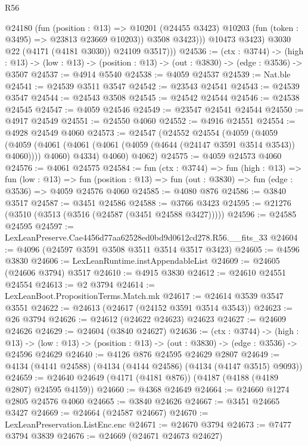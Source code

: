 \begin{lexlean}{R56}
\begin{coremodule}
                @24180
                  (fun (position : @13) =>
                  @10201 (@24455 @3423) @10203 (fun (token : @3495) => @23813 @23669 @10203))
                  @3508
                  @3423)))
            @10473
            @3423)
          @3030
          @22
          (@4171 (@4181 @3030))
          @24109
          @3517)))
@24536 := (ctx : @3744) ->
  (high : @13) -> (low : @13) -> (position : @13) -> (out : @3830) -> (edge : @3536) -> @3507
@24537 := @4914 @5540
@24538 := @4059 @24537
@24539 := Nat.ble
@24541 := @24539 @3511 @3547
@24542 := @23543 @24541
@24543 := @24539 @3547
@24544 := @24543 @3508
@24545 := @24542 @24544
@24546 := @24538 @24545
@24547 := @4059 @24546
@24549 := @23547 @24541 @24544
@24550 := @4917 @24549
@24551 := @24550 @4060
@24552 := @4916 @24551
@24554 := @4928 @24549 @4060
@24573 := @24547
    (@24552
      @24554
      (@4059
        (@4059
          (@4059 (@4061 (@4061 (@4061 (@4059 (@4644 (@24147 @3591 @3514 @3543)) @4060)))) @4060)
          @4334)
        @4060)
      @4062)
@24575 := @4059 @24573 @4060
@24576 := @4061 @24575
@24584 := fun (ctx : @3744) =>
  fun (high : @13) =>
  fun (low : @13) =>
  fun (position : @13) => fun (out : @3830) => fun (edge : @3536) => @4059 @24576 @4060
@24585 := @4080 @876
@24586 := @3840 @3517
@24587 := @3451 @24586
@24588 := @3766 @3423
@24595 := @21276 (@3510 (@3513 (@3516 (@24587 (@3451 @24588 @3427)))))
@24596 := @24585 @24595
@24597 := LexLeanPreserve.Cae4456d77aa62528ed0bd9d0612cd278.R56.__fits_33
@24604 := @4096 (@24597 @3591 @3508 @3511 @3514 @3517 @3423)
@24605 := @4596 @3830
@24606 := LexLeanRuntime.instAppendableList
@24609 := @24605 (@24606 @3794) @3517
@24610 := @4915 @3830
@24612 := @24610 @24551 @24554
@24613 := @2 @3794
@24614 := LexLeanBoot.PropositionTerms.Match.mk
@24617 := @24614 @3539 @3547 @3551
@24622 := @24613 (@24617 (@24152 @3591 @3514 @3543))
@24623 := @26 @3794
@24626 := @24612 (@24622 @24623) @24623
@24627 := @24609 @24626
@24629 := @24604 (@3840 @24627)
@24636 := (ctx : @3744) ->
  (high : @13) ->
  (low : @13) -> (position : @13) -> (out : @3830) -> (edge : @3536) -> @24596 @24629
@24640 := @4126 @876 @24595 @24629 @2807
@24649 := @4134 (@4141 @24588) (@4134 (@4144 @24586) (@4134 (@4147 @3515) @9093))
@24659 := @24640 @24649 (@4171 (@4181 @876)) (@4187 (@4188 (@4189 @2807) @24595 @4159))
@24660 := @4368 @24649
@24664 := @24660 @1274 @2805 @24576 @4060
@24665 := @3840 @24626
@24667 := @3451 @24665 @3427
@24669 := @24664 (@24587 @24667)
@24670 := LexLeanPreservation.ListEnc.enc
@24671 := @24670 @3794
@24673 := @7477 @3794 @3839
@24676 := @24669 (@24671 @24673 @24627)

\end{coremodule}
\end{lexlean}
